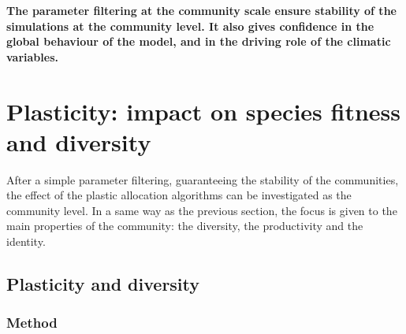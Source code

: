 \textbf{The parameter filtering at the community scale ensure stability of the simulations at the community level. It also gives confidence in the global behaviour of the model, and in the driving role of the climatic variables.}
%
%

\chapter{Plasticity: impact on species fitness and diversity}

After a simple parameter filtering, guaranteeing the stability of the communities, the effect of the plastic allocation algorithms can be investigated as the community level. In a same way as the previous section, the focus is given to the main properties of the community: the diversity, the productivity and the identity. 
%
%
%

\section{Plasticity and diversity}


\subsection{Method}


